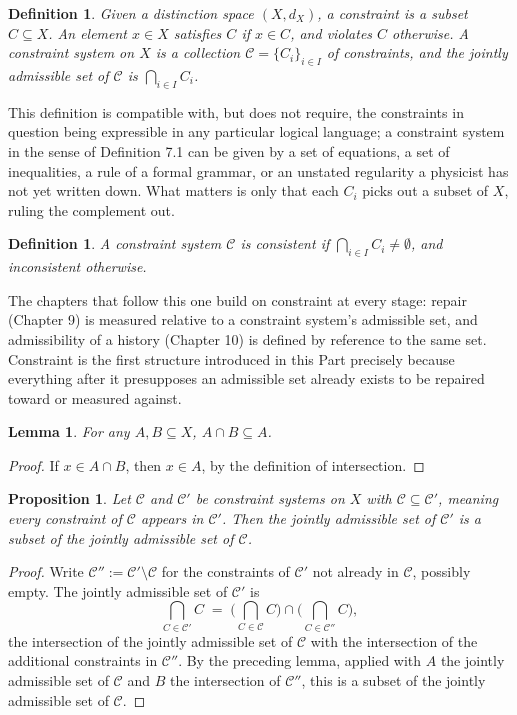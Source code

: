 \documentclass[11pt]{book}
\newtheorem{definition}[theorem]{Definition}
\newtheorem{lemma}[theorem]{Lemma}
\newtheorem{proposition}[theorem]{Proposition}
\begin{document}
\begin{definition}
Given a distinction space $(X, d_X)$, a \emph{constraint} is a subset $C \subseteq X$. An element $x \in X$ \emph{satisfies} $C$ if $x \in C$, and \emph{violates} $C$ otherwise. A \emph{constraint system} on $X$ is a collection $\mathcal C = \{C_i\}_{i \in I}$ of constraints, and the \emph{jointly admissible set} of $\mathcal C$ is $\bigcap_{i \in I} C_i$.
\end{definition}

This definition is compatible with, but does not require, the constraints in question being expressible in any particular logical language; a constraint system in the sense of Definition 7.1 can be given by a set of equations, a set of inequalities, a rule of a formal grammar, or an unstated regularity a physicist has not yet written down. What matters is only that each $C_i$ picks out a subset of $X$, ruling the complement out.

\begin{definition}
A constraint system $\mathcal C$ is \emph{consistent} if $\bigcap_{i \in I} C_i \neq \emptyset$, and \emph{inconsistent} otherwise.
\end{definition}

The chapters that follow this one build on constraint at every stage: repair (Chapter 9) is measured relative to a constraint system's admissible set, and admissibility of a history (Chapter 10) is defined by reference to the same set. Constraint is the first structure introduced in this Part precisely because everything after it presupposes an admissible set already exists to be repaired toward or measured against.

\begin{lemma}
For any $A, B \subseteq X$, $A \cap B \subseteq A$.
\end{lemma}

\begin{proof}
If $x \in A \cap B$, then $x \in A$, by the definition of intersection.
\end{proof}

\begin{proposition}
Let $\mathcal C$ and $\mathcal C'$ be constraint systems on $X$ with $\mathcal C \subseteq \mathcal C'$, meaning every constraint of $\mathcal C$ appears in $\mathcal C'$. Then the jointly admissible set of $\mathcal C'$ is a subset of the jointly admissible set of $\mathcal C$.
\end{proposition}

\begin{proof}
Write $\mathcal C'' := \mathcal C' \setminus \mathcal C$ for the constraints of $\mathcal C'$ not already in $\mathcal C$, possibly empty. The jointly admissible set of $\mathcal C'$ is
\[
\bigcap_{C \in \mathcal C'} C \;=\; \Big(\bigcap_{C \in \mathcal C} C\Big) \cap \Big(\bigcap_{C \in \mathcal C''} C\Big),
\]
the intersection of the jointly admissible set of $\mathcal C$ with the intersection of the additional constraints in $\mathcal C''$. By the preceding lemma, applied with $A$ the jointly admissible set of $\mathcal C$ and $B$ the intersection of $\mathcal C''$, this is a subset of the jointly admissible set of $\mathcal C$.
\end{proof}
\end{document}
